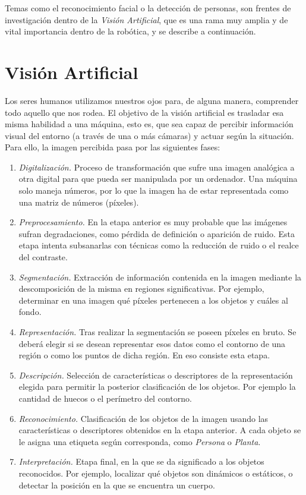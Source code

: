 Temas como el reconocimiento facial o la detección de personas, son frentes de investigación dentro de la \textit{Visión Artificial}, que es una rama muy amplia y de vital importancia dentro de la robótica, y se describe a continuación.

\section{Visión Artificial}

Los seres humanos utilizamos nuestros ojos para, de alguna manera, comprender todo aquello que nos rodea. El objetivo de la visión artificial es trasladar esa misma habilidad a una máquina, esto es, que sea capaz de percibir información visual del entorno (a través de una o más cámaras) y actuar según la situación. Para ello, la imagen percibida pasa por las siguientes fases:

\begin{enumerate}
    \item \textit{Digitalización.} Proceso de transformación que sufre una imagen analógica a otra digital para que pueda ser manipulada por un ordenador. Una máquina solo maneja números, por lo que la imagen ha de estar representada como una matriz de números (píxeles).
    
    \item \textit{Preprocesamiento.} En la etapa anterior es muy probable que las imágenes sufran degradaciones, como pérdida de definición o aparición de ruido. Esta etapa intenta subsanarlas con técnicas como la reducción de ruido o el realce del contraste.
    
    \item \textit{Segmentación.} Extracción de información contenida en la imagen mediante la descomposición de la misma en regiones significativas. Por ejemplo, determinar en una imagen qué píxeles pertenecen a los objetos y cuáles al fondo.
    
    \item \textit{Representación.} Tras realizar la segmentación se poseen píxeles en bruto. Se deberá elegir si se desean representar esos datos como el contorno de una región o como los puntos de dicha región. En eso consiste esta etapa.
    
    \item \textit{Descripción.} Selección de características o descriptores de la representación elegida para permitir la posterior clasificación de los objetos. Por ejemplo la cantidad de huecos o el perímetro del contorno.
    
    \item \textit{Reconocimiento.} Clasificación de los objetos de la imagen usando las características o descriptores obtenidos en la etapa anterior. A cada objeto se le asigna una etiqueta según corresponda, como \textit{Persona} o \textit{Planta}.
    
    \item \textit{Interpretación.} Etapa final, en la que se da significado a los objetos reconocidos. Por ejemplo, localizar qué objetos son dinámicos o estáticos, o detectar la posición en la que se encuentra un cuerpo.
\end{enumerate}

